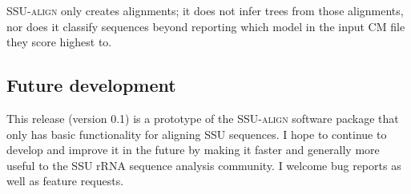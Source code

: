\textsc{SSU-align} only creates alignments; it does not infer trees
from those alignments, nor does it classify sequences beyond reporting
which model in the input CM file they score highest to.

\subsection{Future development}

This release (version 0.1) is a prototype of the \textsc{SSU-align}
software package that only has basic functionality for aligning SSU
sequences. I hope to continue to develop and improve it in the future
by making it faster and generally more useful to the SSU rRNA sequence
analysis community. I welcome bug reports as well as feature requests.
